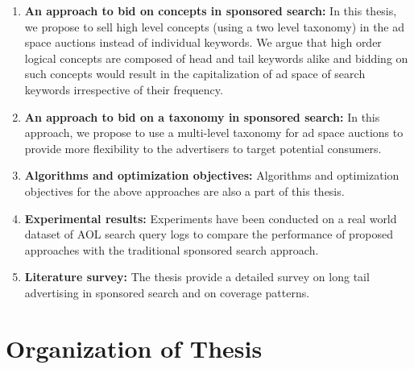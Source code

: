 \begin{enumerate}[label=(\roman*).]
\item \textbf{An approach to bid on concepts in sponsored search:} In this thesis, we propose to sell high level concepts (using a two level taxonomy) in the ad space auctions instead of individual keywords. We argue that high order logical concepts are composed of head and tail keywords alike and bidding on such concepts would result in the capitalization of ad space of search keywords irrespective of their frequency.

\item \textbf{An approach to bid on a taxonomy in sponsored search:} In this approach, we propose to use a multi-level taxonomy for ad space auctions to provide more flexibility to the advertisers to target potential consumers.

\item \textbf{Algorithms and optimization objectives:} Algorithms and optimization objectives for the above approaches are also a part of this thesis.

\item \textbf{Experimental results:} Experiments have been conducted on a real world dataset of AOL search query logs to compare the performance of proposed approaches with the traditional sponsored search approach.

\item \textbf{Literature survey:} The thesis provide a detailed survey on long tail advertising in sponsored search and on coverage patterns.

\end{enumerate}

\section{Organization of Thesis}

